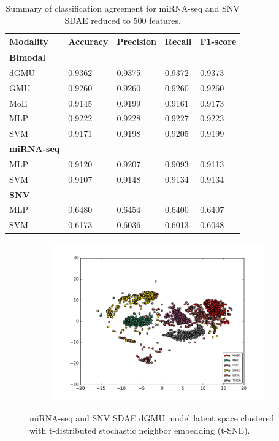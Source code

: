 \begin{table}[H]
   \caption{Summary of classification agreement for miRNA-seq and SNV SDAE reduced to 500 features.} 
   \small %
   \centering %
   \begin{tabular}{lllll} %
   \toprule[\heavyrulewidth]\toprule[\heavyrulewidth]
   \textbf{Modality} & \textbf{Accuracy} & \textbf{Precision} & \textbf{Recall} & \textbf{F1-score} \\ 
   \midrule
   \multicolumn{1}{l}{\textbf{Bimodal}} \\
        dGMU & 0.9362 & 0.9375 & 0.9372 & 0.9373\\
        GMU  & 0.9260 & 0.9260 & 0.9260 & 0.9260\\
        MoE  & 0.9145 & 0.9199 & 0.9161 & 0.9173\\
        MLP  & 0.9222 & 0.9228 & 0.9227 & 0.9223\\
        SVM  & 0.9171 & 0.9198 & 0.9205 & 0.9199\\
   \midrule
   \multicolumn{1}{l}{\textbf{miRNA-seq}} \\
        MLP  & 0.9120 & 0.9207 & 0.9093 & 0.9113\\
        SVM  & 0.9107 & 0.9148 & 0.9134 & 0.9134\\
   \midrule
   \multicolumn{1}{l}{\textbf{SNV}}  \\
        MLP  & 0.6480 & 0.6454 & 0.6400 & 0.6407\\
        SVM  & 0.6173 & 0.6036 & 0.6013 & 0.6048\\
   \bottomrule[\heavyrulewidth] 
   \end{tabular}
   \label{table:c_r_sdae_summary}
\end{table}

\begin{figure}[H]
     \centering
     \begin{subfigure}[b]{\textwidth}
         \centering
         \includegraphics[width=\textwidth]{img/m_s/m_s_sdae_tsne.png}
     \end{subfigure}
        \caption{miRNA-seq and SNV SDAE dGMU model latent space clustered with t-distributed stochastic neighbor embedding (t-SNE).}
        \label{fig:m_s_sdae_tsne}
\end{figure}

